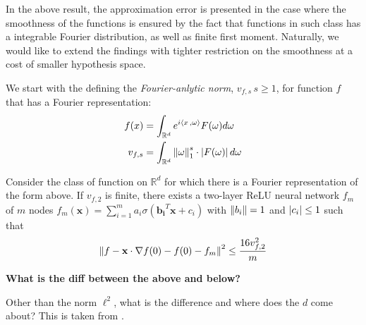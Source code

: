 
In the above result, the approximation error is presented in the case where the
smoothness of the functions is ensured by the fact that functions in such class
has a integrable Fourier distribution, as well as finite first moment.
Naturally, we would like to extend the findings with tighter restriction on the
smoothness at a cost of smaller hypothesis space.

We start with the defining the \textit{Fourier-anlytic norm}, $v_{f, s}\, s \geq
    1$, for function $f$ that has a Fourier representation:
\begin{align}
    f(x)     & = \int_{\mathbb{R}^d} e^{i\left\langle x\, , \omega \right\rangle} F(\omega) d\omega \label{eq:fourier_rep}           \\
    v_{f, s} & = \int_{\mathbb{R}^d} \left\| \omega \right\|_1^s \cdot \left| F(\omega) \right| d\omega \label{eq:fourier_norm}
\end{align}


\begin{theorem}\label{thm:appr_f2}
    Consider the class of function on $\mathbb{R}^d$ for which there is a
    Fourier representation of the form above. If $v_{f, 2}$ is finite, there
    exists a two-layer ReLU neural network $f_m$ of $m$ nodes $f_m(\mathbf{x})
        = \sum_{i=1}^m a_i \sigma(\mathbf{b_i}^T\mathbf{x} + c_i)$ with $\left\| b_i \right\|
        = 1$ and $\left| c_i \right|\leq 1$ such that
    \begin{equation}
        \left\| f
            - \mathbf{x} \cdot \nabla f(0)
            - f(0)
            - f_m \right\|^2 \leq \frac{16 v_{f, 2}^2}{m}
    \end{equation}
\end{theorem}

\textbf{What is the diff between the above and below?}

Other than the norm $\ell^2$, what is the difference and where does the $d$ come
about? This is taken from \cite{klusowskiApproximationCombinationsReLU2018}.

